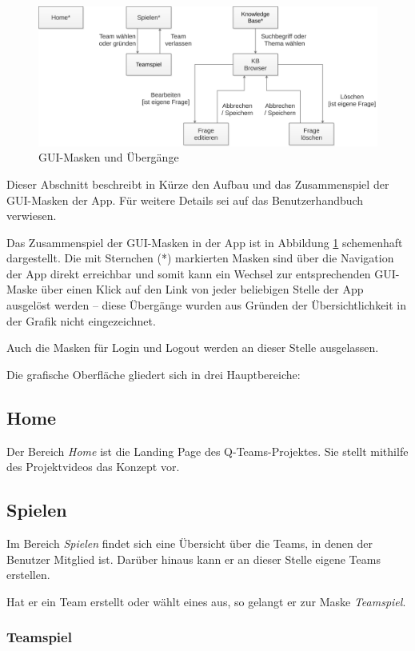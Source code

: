 \documentclass[a4paper,11pt,listof=numbered,glossary=totoc,parskip=half,toc=bib]{scrreprt}
\begin{document}
	\begin{figure}
		\centering
		\includegraphics[width=\textwidth]{gui.png}
		\caption{GUI-Masken und Übergänge}
		\label{fig:gui}
	\end{figure}
	
	Dieser Abschnitt beschreibt in Kürze den Aufbau und das Zusammenspiel der GUI-Masken der App. Für weitere Details sei auf das Benutzerhandbuch verwiesen.
	
	Das Zusammenspiel der GUI-Masken in der App ist in Abbildung \ref{fig:gui} schemenhaft dargestellt. Die mit Sternchen (*) markierten Masken sind über die Navigation der App direkt erreichbar und somit kann ein Wechsel zur entsprechenden GUI-Maske über einen Klick auf den Link von jeder beliebigen Stelle der App ausgelöst werden -- diese Übergänge wurden aus Gründen der Übersichtlichkeit in der Grafik nicht eingezeichnet.
	
	Auch die Masken für Login und Logout werden an dieser Stelle ausgelassen.
	
	Die grafische Oberfläche gliedert sich in drei Hauptbereiche:
		
	\subsection{Home}
	Der Bereich \textit{Home} ist die Landing Page des Q-Teams-Projektes. Sie stellt mithilfe des Projektvideos das Konzept vor.

	\subsection{Spielen}
	Im Bereich \textit{Spielen} findet sich eine Übersicht über die Teams, in denen der Benutzer Mitglied ist. Darüber hinaus kann er an dieser Stelle eigene Teams erstellen.
	
	Hat er ein Team erstellt oder wählt eines aus, so gelangt er zur Maske \textit{Teamspiel}.
	
	\subsubsection{Teamspiel}	
\end{document}
